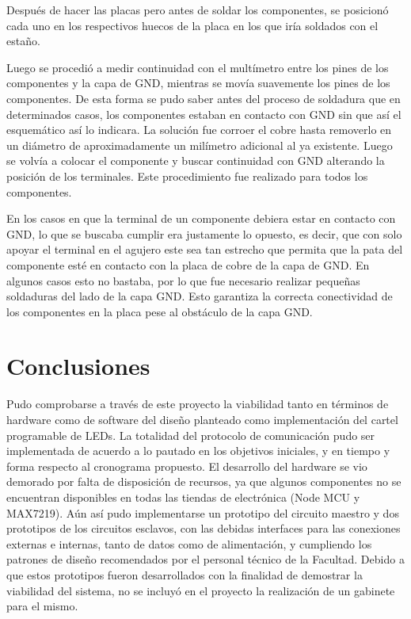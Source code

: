 Después de hacer las placas pero antes de soldar los componentes, se posicionó cada uno en los respectivos huecos de la placa en los que iría soldados con el estaño.

Luego se procedió a medir continuidad con el multímetro entre los pines de los componentes y la capa de GND, mientras se movía suavemente los pines de los componentes. De esta forma se pudo saber antes del proceso de soldadura que en determinados casos, los componentes estaban en contacto con GND sin que así el esquemático así lo indicara. La solución fue corroer el cobre hasta removerlo en un diámetro de aproximadamente un milímetro adicional al ya existente. Luego se volvía a colocar el componente y buscar continuidad con GND alterando la posición de los terminales. Este procedimiento fue realizado para todos los componentes.

En los casos en que la terminal de un componente debiera estar en contacto con GND, lo que se buscaba cumplir era justamente lo opuesto, es decir, que con solo apoyar el terminal en el agujero este sea tan estrecho que permita que la pata del componente esté en contacto con la placa de cobre de la capa de GND. En algunos casos esto no bastaba, por lo que fue necesario realizar pequeñas soldaduras del lado de la capa GND. Esto garantiza la correcta conectividad de los componentes en la placa pese al obstáculo de la capa GND.


\section{Conclusiones}

Pudo comprobarse a través de este proyecto la viabilidad tanto en términos de hardware como de software del diseño planteado como implementación del cartel programable de LEDs. 
La totalidad del protocolo de comunicación pudo ser implementada de acuerdo a lo pautado en los objetivos iniciales, y en tiempo y forma respecto al cronograma propuesto. El desarrollo del hardware se vio demorado por falta de disposición de recursos, ya que algunos componentes no se encuentran disponibles en todas las tiendas de electrónica (Node MCU y MAX7219). Aún así pudo implementarse un prototipo del circuito maestro y dos prototipos de los circuitos esclavos, con las debidas interfaces para las conexiones externas e internas, tanto de datos como de alimentación, y cumpliendo los patrones de diseño recomendados por el personal técnico de la Facultad. Debido a que estos prototipos fueron desarrollados con la finalidad de demostrar la viabilidad del sistema, no se incluyó en el proyecto la realización de un gabinete para el mismo.

